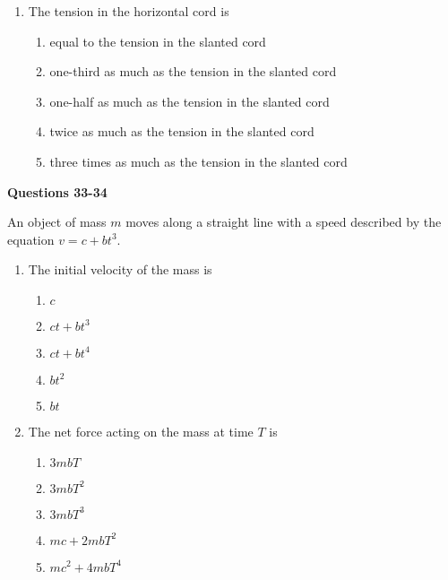 \documentclass{../../oss-apphys}
\begin{document}
\begin{multicols}{2}
\begin{enumerate}[resume,leftmargin=18pt]
  \item The tension in the horizontal cord is
    \begin{enumerate}[noitemsep,topsep=0pt,leftmargin=18pt,label=(\Alph*)]
    \item equal to the tension in the slanted cord
    \item one-third as much as the tension in the slanted cord
    \item one-half as much as the tension in the slanted cord
    \item twice as much as the tension in the slanted cord
    \item three times as much as the tension in the slanted cord
    \end{enumerate}
  \end{enumerate}
  \columnbreak
  
  \textbf{Questions 33-34}

  An object of mass $m$ moves along a straight line with a speed described by
  the equation $v=c+bt^3$.
  \begin{enumerate}[resume,leftmargin=18pt]
  \item The initial velocity of the mass is
    \begin{enumerate}[noitemsep,topsep=0pt,leftmargin=18pt,label=(\Alph*)]
    \item $c$
    \item $ct+bt^3$
    \item $ct+bt^4$
    \item $bt^2$
    \item $bt$
    \end{enumerate}

  \item The net force acting on the mass at time $T$ is
    \begin{enumerate}[noitemsep,topsep=0pt,leftmargin=18pt,label=(\Alph*)]
    \item $3mbT$
    \item $3mbT^2$
    \item $3mbT^3$
    \item $mc+2mbT^2$
    \item $mc^2+4mbT^4$
    \end{enumerate}



\end{enumerate}
\end{multicols}
\end{document}
